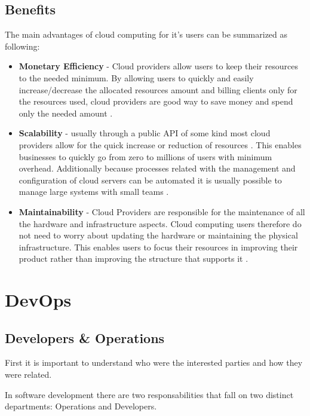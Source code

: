   		\subsection{Benefits} \label{chap:stateoftheheart:sec:cloud:sec:benefits}
  			The main advantages of cloud computing for it's users can be summarized as following:
  			\begin{itemize}
  				\item \textbf{Monetary Efficiency} - Cloud providers allow users to keep their resources to the needed minimum. By allowing users to quickly and easily increase/decrease the allocated resources amount and billing clients only for the resources used, cloud providers are good way to save money and spend only the needed amount \cite{Garrison2012,Mell2011}.
  				\item \textbf{Scalability} - usually through a public API of some kind most cloud providers allow for the quick increase or reduction of resources \cite{Mell2011}. This enables businesses to quickly go from zero to millions of users with minimum overhead. Additionally because processes related with the management and configuration of cloud servers can be automated it is usually possible to manage large systems with small teams \cite{Loukides2012}.
  	    	\item \textbf{Maintainability} - Cloud Providers are responsible for the maintenance of all the hardware and infrastructure aspects. Cloud computing users therefore do not need to worry about updating the hardware or maintaining the physical infrastructure. This enables users to focus their resources in improving their product rather than improving the structure that supports it \cite{Garrison2012}.
  			\end{itemize}

	\section{DevOps} \label{chap:stateoftheart:sec:devops}

      \subsection{Developers \& Operations} \label{chap:stateoftheheart:sec:devops:sec:devsandoperations}
      First it is important to understand who were the interested parties and how they were related.

      In software development there are two responsabilities that fall on two distinct departments: Operations and Developers.

